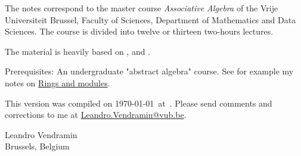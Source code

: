 \preface

The notes correspond to the master  
course \emph{Associative Algebra} of the 
Vrije Universiteit Brussel, 
Faculty of Sciences, 
Department of Mathematics and Data Sciences. The course
is divided into twelve or thirteen two-hours lectures. 

The material is heavily based on \cite{MR3308118}, \cite{MR1449137} and 
\cite{MR798076}. 

Prerequisites: An undergraduate "abstract algebra" course. See for example
my notes on \href{https://github.com/vendramin/rings}{Rings and modules}. 

\medskip
This version 
was compiled on \today~at~\currenttime.
Please send comments and corrections to me at \url{Leandro.Vendramin@vub.be}. 


\bigskip
\begin{flushright}
Leandro Vendramin\\Brussels, Belgium\par
\end{flushright}
